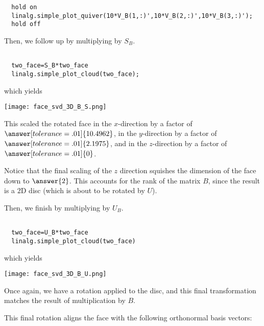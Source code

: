 \documentclass{ximera}
\begin{document}
\begin{problem}
\begin{feedback}
\begin{verbatim}
  hold on
  linalg.simple_plot_quiver(10*V_B(1,:)',10*V_B(2,:)',10*V_B(3,:)');
  hold off
\end{verbatim}

\end{feedback}

Then, we follow up by multiplying by $S_B$.

\begin{verbatim}

  two_face=S_B*two_face
  linalg.simple_plot_cloud(two_face);

\end{verbatim}

which yields

\begin{center}
  \texttt{[image: face\_svd\_3D\_B\_S.png]}
\end{center}

This scaled the rotated face in the $x$-direction by a factor of $\answer[tolerance=.01]{10.4962}$, in the $y$-direction by a factor of $\answer[tolerance=.01]{2.1975}$, and in the $z$-direction by a factor of $\answer[tolerance=.01]{0}$.

Notice that the final scaling of the $z$ direction squishes the dimension of the face down to $\answer{2}$. This accounts for the rank of the matrix $B$, since the result is a $2$D disc (which is about to be rotated by $U$).

Then, we finish by multiplying by $U_B$.

\begin{verbatim}

  two_face=U_B*two_face
  linalg.simple_plot_cloud(two_face)

\end{verbatim}

which yields

\begin{center}
  \texttt{[image: face\_svd\_3D\_B\_U.png]}
\end{center}

Once again, we have a rotation applied to the disc, and this final transformation matches the result of multiplication by $B$.

This final rotation aligns the face with the following orthonormal basis vectors:


\end{problem}
\end{document}
